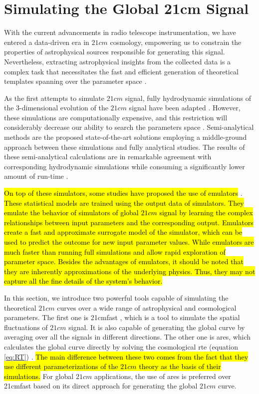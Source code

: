 \documentclass[12pt, TexShade, letterpaper]{report}
\begin{document}
\section{Simulating the Global 21cm Signal}
With the current advancements in radio telescope instrumentation, we have entered a data-driven era in $21cm$ cosmology, empowering us to constrain the properties of astrophysical sources responsible for generating this signal. Nevertheless, extracting astrophysical insights from the collected data is a complex task that necessitates the fast and efficient generation of theoretical templates spanning over the parameter space \cite{emulate_21cm}. \par
As the first attempts to simulate $21cm$ signal, fully hydrodynamic simulations of the 3-dimensional evolution of the $21cm$ signal have been adapted \cite{hydrodynamic_sim}. However, these simulations are computationally expensive, and this restriction will considerably decrease our ability to search the parameters space \cite{ares2014jordan}. 
Semi-analytical methods are the proposed state-of-the-art solutions employing a middle-ground approach between these simulations and fully analytical studies. The results of these semi-analytical calculations are in remarkable agreement with corresponding hydrodynamic simulations while consuming a significantly lower amount of run-time \cite{semi_analytic_1, semi_analytic_2, semi_analytic_3, semi_analytic_4, semi-analytic_5}. \par
\hl{On top of these simulators, some studies have proposed the use of emulators} \cite{emulate_21cm, emulate_21cm_2, emulate_21cm_3}. \hl{These statistical models are trained using the output data of simulators. They emulate the behavior of simulators of global $21cm$ signal by learning the complex relationships between input parameters and the corresponding output. Emulators create a fast and approximate surrogate model of the simulator, which can be used to predict the outcome for new input parameter values. While emulators are much faster than running full simulations and allow rapid exploration of parameter space. Besides the advantages of emulators, it should be noted that they are inherently approximations of the underlying physics. Thus, they may not capture all the fine details of the system's behavior.}\par
In this section, we introduce two powerful tools capable of simulating the theoretical $21cm$ curves over a wide range of astrophysical and cosmological parameters. The first one is \gls{21cmfast} \cite{21cmfast_c, 21cmfast_python}, which is a tool to simulate the spatial fluctuations of $21cm$ signal. It is also capable of generating the global curve by averaging over all the signals in different directions. The other one is \gls{ares}, which calculates the global curve directly by solving the cosmological \gls{rte} (equation \ref{eq:RT}) \cite{ares2014jordan}. \hl{The main difference between these two comes from the fact that they use different parameterizations of the $21cm$ theory as the basis of their simulations.} For global $21cm$ applications, the use of \gls{ares} is preferred over \gls{21cmfast} based on its direct approach for generating the global $21cm$ curve. \par
\end{document}
